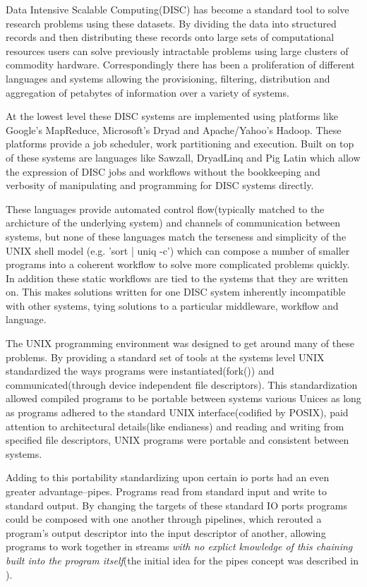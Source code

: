 \documentclass[10pt,conference,letterpaper]{IEEEtran}
\begin{document}
Data Intensive Scalable Computing(DISC)\cite{bryant2007dis} has become a standard tool to solve research problems using these datasets. By dividing the data into structured records and then distributing these records onto large sets of computational resources users can solve previously intractable problems using large clusters of commodity hardware. Correspondingly there has been a proliferation of different languages and systems allowing the provisioning, filtering, distribution and aggregation of petabytes of information over a variety of systems.

At the lowest level these DISC systems are implemented using platforms like Google's MapReduce\cite{dean2008msd}, Microsoft's Dryad\cite{isard2007ddd} and Apache/Yahoo's Hadoop\cite{bialecki:hfr}. These platforms provide a job scheduler, work partitioning and execution. Built on top of these systems are languages like Sawzall\cite{pike2005idp}, DryadLinq\cite{yu2008dsg} and Pig Latin\cite{olston2008pln} which allow the expression of DISC jobs and workflows without the bookkeeping and verbosity of manipulating and programming for DISC systems directly.

These languages provide automated control flow(typically matched to the archicture of the underlying system) and channels of communication between systems, but none of these languages match the terseness and simplicity of the UNIX shell model (e.g. 'sort | uniq -c') which can compose a number of smaller programs into a coherent workflow to solve more complicated problems quickly. In addition these static workflows are tied to the systems that they are written on. This makes solutions written for one DISC system inherently incompatible with other systems, tying solutions to a particular middleware, workflow and language.

The UNIX programming environment was designed to get around many of these problems. By providing a standard set of tools at the systems level UNIX standardized the ways programs were instantiated(fork()) and communicated(through device independent file descriptors).  This standardization allowed compiled programs to be portable between systems various Unices as long as programs adhered to the standard UNIX interface(codified by POSIX), paid attention to architectural details(like endianess) and reading and writing from specified file descriptors, UNIX programs were portable and consistent between systems. 

Adding to this portability standardizing upon certain io ports had an even greater advantage--pipes. Programs read from standard input and write to standard output. By changing the targets of these standard  IO ports programs could be composed with one another through pipelines, which rerouted a program's output descriptor into the input descriptor of another, allowing programs to work together in streams \emph{with no explict knowledge of this chaining built into the program itself}(the initial idea for the pipes concept was described in \cite{mcilroy1964paf}). 
\end{document}
